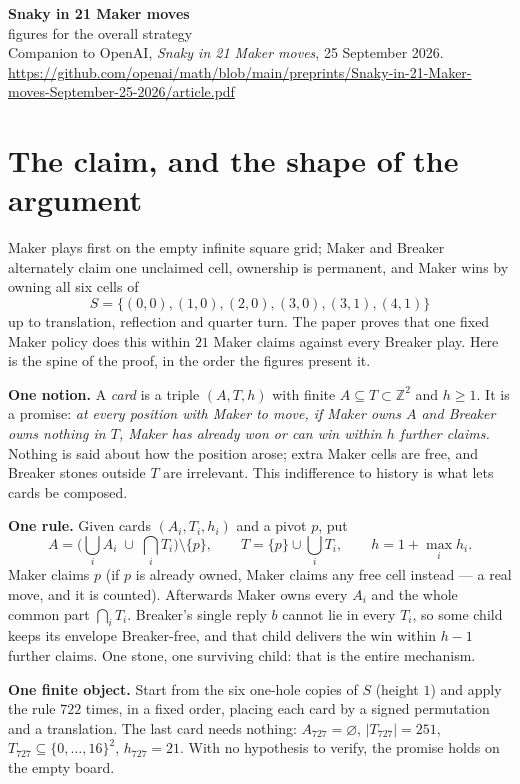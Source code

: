 \documentclass[11pt,a4paper]{article}
\newcommand{\Snaky}{S}
\newcommand{\Z}{\mathbb{Z}}
\begin{document}
\begin{center}
{\LARGE\bfseries Snaky in 21 Maker moves}\\[2pt]
{\large figures for the overall strategy}\\[8pt]
{\small Companion to OpenAI, \emph{Snaky in 21 Maker moves}, 25 September 2026.\\
\url{https://github.com/openai/math/blob/main/preprints/Snaky-in-21-Maker-moves-September-25-2026/article.pdf}}
\end{center}

\vspace{-2pt}
\section*{The claim, and the shape of the argument}

Maker plays first on the empty infinite square grid; Maker and Breaker alternately claim one
unclaimed cell, ownership is permanent, and Maker wins by owning all six cells of
\[
\Snaky=\{(0,0),(1,0),(2,0),(3,0),(3,1),(4,1)\}
\]
up to translation, reflection and quarter turn. The paper proves that one fixed Maker policy
does this within $21$ Maker claims against every Breaker play. Here is the spine of the proof,
in the order the figures present it.

\textbf{One notion.} A \emph{card} is a triple $(A,T,h)$ with finite $A\subseteq T\subset\Z^2$ and
$h\ge 1$. It is a promise: \emph{at every position with Maker to move, if Maker owns $A$ and
Breaker owns nothing in $T$, Maker has already won or can win within $h$ further claims.}
Nothing is said about how the position arose; extra Maker cells are free, and Breaker stones
outside $T$ are irrelevant. This indifference to history is what lets cards be composed.

\textbf{One rule.} Given cards $(A_i,T_i,h_i)$ and a pivot $p$, put
\[
A=\Big(\bigcup_i A_i\;\cup\;\bigcap_i T_i\Big)\setminus\{p\},
\qquad
T=\{p\}\cup\bigcup_i T_i,
\qquad
h=1+\max_i h_i .
\]
Maker claims $p$ (if $p$ is already owned, Maker claims any free cell instead --- a real move,
and it is counted). Afterwards Maker owns every $A_i$ and the whole common part $\bigcap_i T_i$.
Breaker's single reply $b$ cannot lie in every $T_i$, so some child keeps its envelope Breaker-free,
and that child delivers the win within $h-1$ further claims. One stone, one surviving child:
that is the entire mechanism.

\textbf{One finite object.} Start from the six one-hole copies of $\Snaky$ (height $1$) and apply
the rule $722$ times, in a fixed order, placing each card by a signed permutation and a
translation. The last card needs nothing: $A_{727}=\varnothing$, $|T_{727}|=251$,
$T_{727}\subseteq\{0,\dots,16\}^2$, $h_{727}=21$. With no hypothesis to verify, the promise
holds on the empty board.
\end{document}
